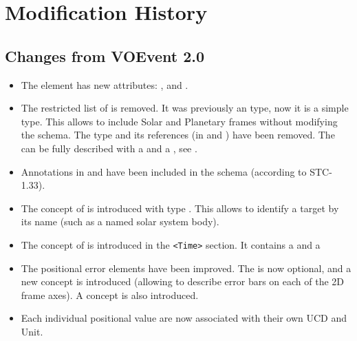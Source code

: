 \documentclass[11pt,a4paper]{ivoa}
\begin{document}



\appendix

\section{Modification History}
\subsection{Changes from VOEvent 2.0}
\label{appendix:last-changes}
\begin{itemize}
\item The  element has new attributes: ,
 and .
\item The restricted list of  is removed. It was
previously an  type, now it is a simple  type.
This allows to include Solar and Planetary frames without modifying the
schema. The  type and its references (in 
and ) have been removed. The  can
be fully described with a  and a , see
\citet{2007ivoa.spec.1030R}.
\item Annotations in  and 
have been included in the schema (according to STC-1.33).
\item The concept of  is introduced with
type . This allows to identify a target by its name (such as a named solar
system body).
\item The concept of  is introduced in the \verb|<Time>|
section. It contains a  and a 
\item The positional error elements have been improved. The 
is now optional, and a new 
concept is introduced (allowing to describe error bars on each of the 2D frame
axes). A  concept is also introduced.
\item Each individual positional value are now associated with their own UCD
and Unit.
\end{itemize}
\end{document}
